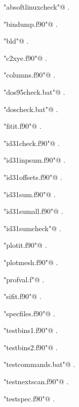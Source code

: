 \documentclass[10pt,a4paper,notitlepage]{article}
\begin{document}
{\small\begin{list}{}{\setlength{\itemsep}{-\parsep}\setlength{\itemindent}{-\leftmargin}}
\item \verb@"absoftlinuxcheck"@ {\footnotesize {\NWtxtDefBy} .}
\item \verb@"bindump.f90"@ {\footnotesize {\NWtxtDefBy} .}
\item \verb@"bld"@ {\footnotesize {\NWtxtDefBy} .}
\item \verb@"c2xye.f90"@ {\footnotesize {\NWtxtDefBy} .}
\item \verb@"columns.f90"@ {\footnotesize {\NWtxtDefBy} .}
\item \verb@"dos95check.bat"@ {\footnotesize {\NWtxtDefBy} .}
\item \verb@"doscheck.bat"@ {\footnotesize {\NWtxtDefBy} .}
\item \verb@"fitit.f90"@ {\footnotesize {\NWtxtDefBy} .}
\item \verb@"id31check.f90"@ {\footnotesize {\NWtxtDefBy} .}
\item \verb@"id31inpsum.f90"@ {\footnotesize {\NWtxtDefBy} .}
\item \verb@"id31offsets.f90"@ {\footnotesize {\NWtxtDefBy} .}
\item \verb@"id31sum.f90"@ {\footnotesize {\NWtxtDefBy} .}
\item \verb@"id31sumall.f90"@ {\footnotesize {\NWtxtDefBy} .}
\item \verb@"id31sumcheck"@ {\footnotesize {\NWtxtDefBy} .}
\item \verb@"plotit.f90"@ {\footnotesize {\NWtxtDefBy} .}
\item \verb@"plotmesh.f90"@ {\footnotesize {\NWtxtDefBy} .}
\item \verb@"profval.f"@ {\footnotesize {\NWtxtDefBy} .}
\item \verb@"sifit.f90"@ {\footnotesize {\NWtxtDefBy} .}
\item \verb@"specfiles.f90"@ {\footnotesize {\NWtxtDefBy} .}
\item \verb@"testbins1.f90"@ {\footnotesize {\NWtxtDefBy} .}
\item \verb@"testbins2.f90"@ {\footnotesize {\NWtxtDefBy} .}
\item \verb@"testcommands.bat"@ {\footnotesize {\NWtxtDefBy} .}
\item \verb@"testnextscan.f90"@ {\footnotesize {\NWtxtDefBy} .}
\item \verb@"testspec.f90"@ {\footnotesize {\NWtxtDefBy} .}
\end{list}}
\end{document}
